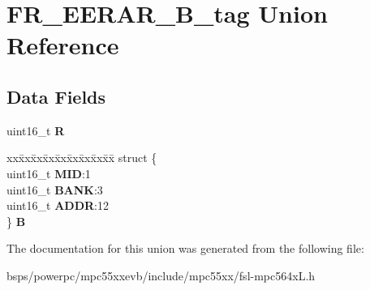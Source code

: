 \hypertarget{unionFR__EERAR__16B__tag}{}\section{F\+R\+\_\+\+E\+E\+R\+A\+R\+\_\+B\+\_\+tag Union Reference}
\label{unionFR__EERAR__16B__tag}
\subsection*{Data Fields}
\begin{DoxyCompactItemize}
\item 
\mbox{\label{unionFR__EERAR__16B__tag_a929a8833bb5f453c653d645a2252f86c}} 
uint16\+\_\+t {\bfseries R}
\item 
\mbox{\label{unionFR__EERAR__16B__tag_a6f446e8b901b0d6d4fe990cec809db65}} 
\begin{tabbing}
xx\=xx\=xx\=xx\=xx\=xx\=xx\=xx\=xx\=\kill
struct \{\\
\>uint16\_t {\bfseries MID}:1\\
\>uint16\_t {\bfseries BANK}:3\\
\>uint16\_t {\bfseries ADDR}:12\\
\} {\bfseries B}\\

\end{tabbing}\end{DoxyCompactItemize}


The documentation for this union was generated from the following file\+:\begin{DoxyCompactItemize}
\item 
bsps/powerpc/mpc55xxevb/include/mpc55xx/fsl-\/mpc564x\+L.\+h\end{DoxyCompactItemize}
